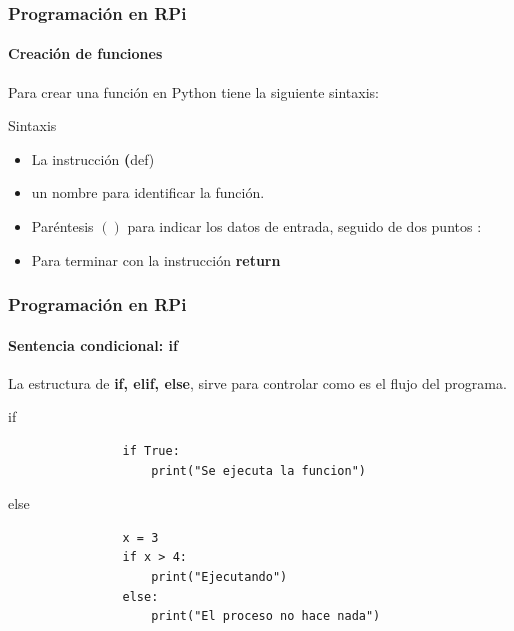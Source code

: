 \documentclass{beamer}
\begin{document}
	\begin{frame}
		\frametitle{Programación en RPi}
		\framesubtitle{Creación   de funciones}
		Para crear una función en Python tiene la siguiente sintaxis: 
		\begin{mybox}{Sintaxis}
			\begin{itemize}
				\item La instrucción \textbf(def)
				\item un nombre para identificar la función.
				\item Paréntesis $()$ para indicar los datos de entrada, seguido de dos puntos :
				\item Para terminar con la instrucción \textbf{return}
			\end{itemize}
		\end{mybox}
	\end{frame}
	\begin{frame}[fragile]
		\frametitle{Programación en RPi}
		\framesubtitle{Sentencia condicional: if}
		La estructura de \textbf{if, elif, else}, sirve para controlar como es el flujo del programa.
		\begin{mybox}{if}
			\begin{lstlisting}
				if True:
					print("Se ejecuta la funcion")
			\end{lstlisting}
		\end{mybox}
		\begin{mybox}{else}
			\begin{lstlisting}
				x = 3
				if x > 4:
					print("Ejecutando")
				else:
					print("El proceso no hace nada")
			\end{lstlisting}
		\end{mybox}
		
	\end{frame}
	
\end{document}
